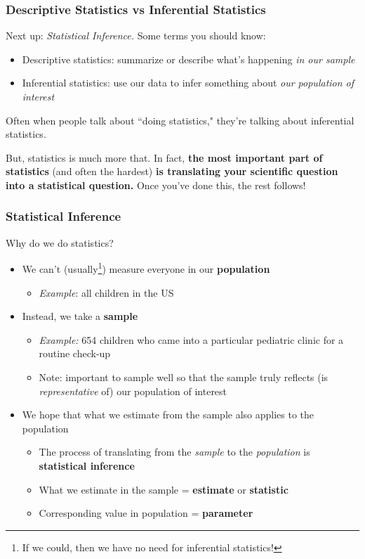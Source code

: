 \documentclass[12pt, 
hyperref={colorlinks=true, linkcolor=blue, urlcolor=cyan}]{beamer}
\begin{document}
\begin{frame}
\frametitle{Descriptive Statistics vs Inferential Statistics}

Next up: \textit{Statistical Inference.} Some terms you should know:

\begin{itemize}
\item \color{blue} Descriptive \color{black} statistics: summarize or \color{blue} describe \color{black} what's happening \color{blue} \textit{in our sample} \color{black}
\item \color{orange} Inferential \color{black} statistics: use our data to \color{orange} infer \color{black} something about \color{orange} \textit{our population of interest} \color{black}
\end{itemize}

Often when people talk about ``doing statistics," they're talking about inferential statistics. 

But, statistics is much more that. In fact, \textbf{the most important part of statistics} (and often the hardest) \textbf{is translating your scientific question into a statistical question.} Once you've done this, the rest follows!

\end{frame}

\begin{frame}
\frametitle{Statistical Inference}
Why do we do statistics? \vspace{-0.3cm}
\begin{itemize}
\item We can't (usually\footnote[frame]{If we could, then we have no need for inferential statistics!}) measure everyone in our \textbf{population}
	\begin{itemize}
	\item \textit{Example}: all children in the US
	\end{itemize}
\pause
\item Instead, we take a \textbf{sample}
	\begin{itemize}
	\item \textit{Example:} 654 children who came into a particular pediatric clinic for a routine check-up
	\item Note: important to sample well so that the sample truly reflects (is \textit{representative} of) our population of interest
	\end{itemize}
\pause
\item We hope that what we estimate from the sample also applies to the population
	\begin{itemize}
	\item The process of translating from the \textit{sample} to the \textit{population} is \textbf{statistical inference}
	\item What we estimate in the sample = \textbf{estimate} or \textbf{statistic}
	\item Corresponding value in population = \textbf{parameter}
	\end{itemize}
\end{itemize}
\end{frame}
\end{document}
